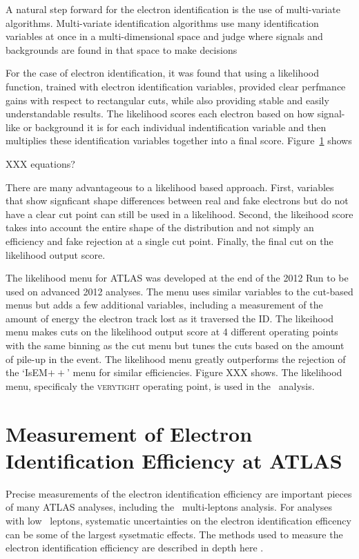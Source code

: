 A natural step forward for the electron identification is the use of multi-variate algorithms. Multi-variate identification algorithms use many identification variables at once in a multi-dimensional space and judge where signals and backgrounds are found in that space to make decisions

For the case of electron identification, it was found that using a likelihood function, trained with electron identification variables, provided clear perfmance gains with respect to rectangular cuts, while also providing stable and easily understandable results. The likelihood scores each electron based on how signal-like or background  it is for each individual indentification variable and then multiplies these identification variables together into a final score. Figure~\ref{} shows 

XXX equations?


There are many advantageous to a likelihood based approach. First, variables that show signficant shape differences between real and fake electrons but do not have a clear cut point can still be used in a likelihood. Second, the likeihood score takes into account the entire shape of the distribution and not simply an efficiency and fake rejection at a single cut point. Finally, the final cut on the likelihood output score.

The likelihood menu for ATLAS was developed at the end of the 2012 Run to be used on advanced 2012 analyses. The menu uses similar variables to the cut-based menus but adds a few additional variables, including a measurement of the amount of energy the electron track lost as it traversed the ID. The likeihood menu makes cuts on the likelihood output score at 4 different operating points with the same binning as the cut menu but tunes the cuts based on the amount of pile-up in the event. The likelihood menu greatly outperforms the rejection of the `IsEM$++$' menu for similar efficiencies. Figure XXX shows. The likelihood menu, specificaly the \textsc{verytight} operating point, is used in the \tth\ analysis.  

\section{Measurement of Electron Identification Efficiency at ATLAS}

Precise measurements of the electron identification efficiency are important pieces of many ATLAS analyses, including the \tth\ multi-leptons analysis. For analyses with low \pt\ leptons, systematic uncertainties on the electron identification efficency can be some of the largest sysetmatic effects. The methods used to measure the electron identification efficiency are described in depth here \cite{}. 

